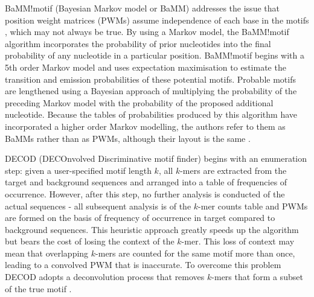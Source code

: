 \documentclass[12pt]{article}
\begin{document}
\begin{appendices}
BaMM!motif (Bayesian Markov model or BaMM) \citep{siebert2016bayesian} addresses the issue that position weight matrices (PWMs) assume independence of each base in the motifs \citep{Jayaram2016}, which may not always be true. By using a Markov model, the BaMM!motif algorithm incorporates the probability of prior nucleotides into the final probability of any nucleotide in a particular position. BaMM!motif begins with a 5th order Markov model and uses expectation maximisation to estimate the transition and emission probabilities of these potential motifs. Probable motifs are lengthened using a Bayesian approach of multiplying the probability of the preceding Markov model with the probability of the proposed additional nucleotide. Because the tables of probabilities produced by this algorithm have incorporated a higher order Markov modelling, the authors refer to them as BaMMs rather than as PWMs, although their layout is the same \citep{siebert2016bayesian}.

DECOD (DECOnvolved Discriminative motif finder) \citep{huggins2011decod} begins with an enumeration step: given a user-specified motif length $k$, all $k$-mers are extracted from the target and background sequences and arranged into a table of frequencies of occurrence. However, after this step, no further analysis is conducted of the actual sequences - all subsequent analysis is of the $k$-mer counts table and PWMs are formed on the basis of frequency of occurrence in target compared to background sequences. This heuristic approach greatly speeds up the algorithm but bears the cost of losing the context of the $k$-mer. This loss of context may mean that overlapping $k$-mers are counted for the same motif more than once, leading to a convolved PWM that is inaccurate. To overcome this problem DECOD adopts a deconvolution process that removes $k$-mers that form a subset of the true motif  \citep{huggins2011decod}.
\end{appendices}

\clearpage


\end{document}
